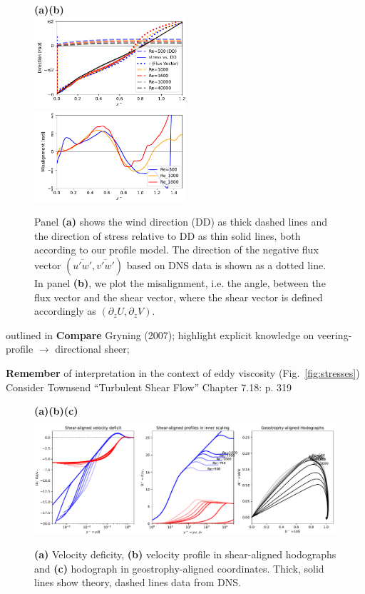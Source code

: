 \documentclass[smallcondensed,final]{svjour3}
\newcommand{\p}{\partial}
\begin{document}
\begin{figure}
  \textbf{(a)\hspace{0.48\textwidth}(b)}\\
  \includegraphics[width=0.5\textwidth]{../plot/stress_rotation.pdf}
  \includegraphics[width=0.5\textwidth]{../plot/misalignment.pdf} 
  \caption{Panel \textbf{(a)} shows the wind direction (DD) as thick dashed lines and the direction of stress relative to DD as thin solid lines, both according to our profile model. The direction of the negative flux vector $(\overline{u'w'},\overline{v'w'})$ based on DNS data is shown as a dotted line. In panel \textbf{(b)}, we plot the misalignment, i.e. the angle, between the flux vector and the shear vector, where the shear vector is defined accordingly as $(\p_z U, \p_z V)$.} 
  \label{fig:alignment}
\end{figure}
outlined in 
\textbf{Compare} Gryning (2007); highlight explicit knowledge on veering-profile $\rightarrow$ directional sheer;

\textbf{Remember} of interpretation in the context of eddy viscosity (Fig.~\ref{fig:stresses}) 
Consider Townsend ``Turbulent Shear Flow''  Chapter 7.18: p. 319 
%
\begin{figure}
  \phantom{AAA}\textbf{(a)\hspace{0.3\textwidth}(b)\hspace{0.3\textwidth}(c)}\\
  \includegraphics[width=\textwidth]{../plot/ekman_profiles.pdf}
  \caption{ \textbf{(a)} Velocity deficity, \textbf{(b)} velocity profile in shear-aligned hodographs and \textbf{(c)} hodograph in geostrophy-aligned coordinates.
    Thick, solid lines show theory, dashed lines data from DNS. }
  \label{fig:hodograph} 
\end{figure} 
\end{document}
